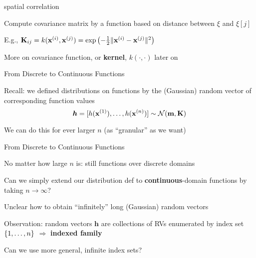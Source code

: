 \documentclass[11pt,compress,t,notes=noshow, xcolor=table]{beamer}
\begin{document}
\begin{framei}[sep=L]{spatial correlation}
\item Compute covariance matrix by a function based on distance between $\xi$ and $\xi[j]$
\item E.g., $\Kmat_{ij} = k(\xi, \xi[j]) = \exp \left(- \tfrac{1}{2} \| \xi - \xi[j] \|^2 \right)$
\vfill
{}
\item More on covariance function, or \textbf{kernel}, $k(\cdot, \cdot)$ later on
\end{framei} 

\begin{framei}{From Discrete to Continuous Functions}
\item Recall: we defined distributions on functions by the (Gaussian) random vector of corresponding function values 
$$\bm{h} = [h(\xi[1]), \dots, h(\xi[n])] \sim \gaussmk$$
\item We can do this for ever larger $n$ (as ``granular'' as we want)
\vfill
{}
\end{framei}

\begin{framei}[sep = L]{From Discrete to Continuous Functions}
\item No matter how large $n$ is: still functions over discrete domains
\item Can we simply extend our distribution def to \textbf{continuous}-domain functions by taking $n \rightarrow \infty$?
\item Unclear how to obtain ``infinitely'' long (Gaussian) random vectors
\item Observation: random vectors $\bm{h}$ are collections of RVs enumerated by index set $\nset$ $\Rightarrow$ \textbf{indexed family} 
\item Can we use more general, infinite index sets? %
\end{framei}
\end{document}
